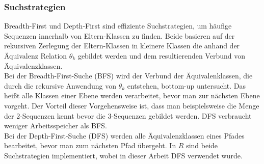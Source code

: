 \subsubsection*{Suchstrategien}
Breadth-First und Depth-First sind effiziente Suchstrategien, um häufige Sequenzen innerhalb von Eltern-Klassen zu finden. Beide basieren auf der rekursiven Zerlegung der Eltern-Klassen in kleinere Klassen die anhand der Äquivalenz Relation $\theta_k$ gebildet werden und dem resultierenden Verbund von Äquivalenzklassen.\\
Bei der Breadth-First-Suche (BFS) wird der Verbund der Äquivalenklassen, die durch die rekursive Anwendung von $\theta_k$ entstehen, bottom-up untersucht. Das heißt alle Klassen einer Ebene werden verarbeitet, bevor man zur nächsten Ebene vorgeht. Der Vorteil dieser Vorgehensweise ist, dass man beispielsweise die Menge der 2-Sequenzen kennt bevor die 3-Sequenzen gebildet werden. DFS verbraucht weniger Arbeitsspeicher als BFS.\\
Bei der Depth-First-Suche (DFS) werden alle Äquivalenzklassen eines Pfades bearbeitet, bevor man zum nächsten Pfad übergeht. In $R$ sind beide Suchstrategien implementiert, wobei in dieser Arbeit DFS verwendet wurde.

